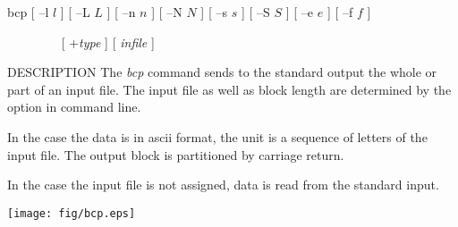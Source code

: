 
\begin{synopsis}
\item[bcp] [ --l $l$ ]  [ --L $L$ ]  [ --n $n$ ]  [ --N $N$ ]
           [ --s $s$ ]  [ --S $S$ ]  [ --e $e$ ]  [ --f $f$ ]
\item[\ ~~~~~~~] [ +{\em type} ] [ {\em infile} ] 
\end{synopsis}

\begin{qsection}{DESCRIPTION}
The {\em bcp} command sends to the standard output
the whole or part of an input file.
The input file as well as block length are determined by
the option in command line.
\par
In the case the data is in ascii format, the unit is
a sequence of letters of the input file.
The output block is partitioned by carriage return.
\par
In the case the input file is not assigned,
data is read from the standard input.
\end{qsection}

\begin{center}
\leavevmode
\texttt{[image: fig/bcp.eps]}
\end{center}

\begin{options}
\end{options}

